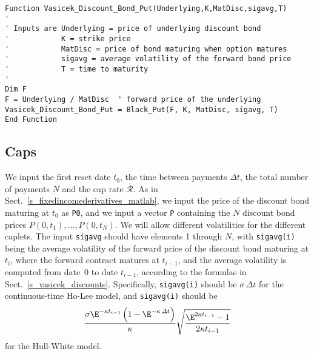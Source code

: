 \small\begin{verbatim}
Function Vasicek_Discount_Bond_Put(Underlying,K,MatDisc,sigavg,T)
'
' Inputs are Underlying = price of underlying discount bond
'            K = strike price
'            MatDisc = price of bond maturing when option matures
'            sigavg = average volatility of the forward bond price
'            T = time to maturity
'
Dim F
F = Underlying / MatDisc  ' forward price of the underlying
Vasicek_Discount_Bond_Put = Black_Put(F, K, MatDisc, sigavg, T)
End Function
\end{verbatim}\normalsize

\subsection*{Caps}
 We input the first reset date $t_0$, the time between payments $\varDelta t$, the total number of payments $N$ and the cap rate $\bar{\mathcal{R}}$.  As in Sect.~\ref{s_fixedincomederivatives_matlab}, we input the price of the discount bond maturing at $t_0$ as \verb!P0!, and we input a vector \verb!P! containing the $N$ discount bond prices $P(0,t_1),\ldots,P(0,t_{N})$.  We will allow different volatilities for the different caplets.  The input \verb!sigavg! should have elements 1 through $N$, with \verb!sigavg(i)! being the average volatility of the forward price of the discount bond maturing at $t_i$, where the forward contract matures at $t_{i-1}$, and the average volatility is computed from date~0 to date $t_{i-1}$, according to the formulas in Sect.~\ref{s_vasicek_discounts}.  Specifically, \verb!sigavg(i)! should be $\sigma\,\varDelta t$ for the continuous-time Ho-Lee model, and \verb!sigavg(i)! should be
 \begin{equation}\label{vasicekvbacap}
 \frac{\sigma \E^{-\kappa t_{i-1}}\left(1- \E^{-\kappa \,\varDelta t}\right) }{\kappa}\sqrt{\frac{\E^{2\kappa t_{i-1}}-1}{2\kappa t_{i-1}}}
 \end{equation}
 for the Hull-White model.  


